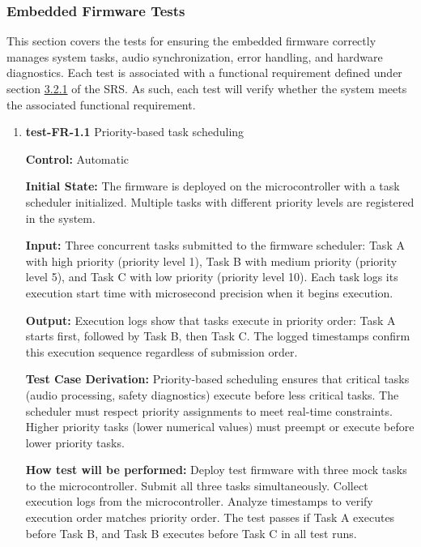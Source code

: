 \documentclass[12pt, titlepage]{article}
\begin{document}
\subsubsection{Embedded Firmware Tests}

This section covers the tests for ensuring the embedded firmware correctly 
manages system tasks, audio synchronization, error handling, and hardware 
diagnostics. Each test is associated with a functional requirement defined 
under section \hyperref[SRS-sec:FR1]{3.2.1} of the SRS. As such, each test 
will verify whether the system meets the associated functional requirement.

\begin{enumerate}

\item{\textbf{test-FR-1.1} Priority-based task scheduling \\}

\textbf{Control:} Automatic
					
\textbf{Initial State:} 
The firmware is deployed on the microcontroller with a task scheduler initialized. 
Multiple tasks with different priority levels are registered in the system.
					
\textbf{Input:}
Three concurrent tasks submitted to the firmware scheduler: Task A with high 
priority (priority level 1), Task B with medium priority (priority level 5), 
and Task C with low priority (priority level 10). Each task logs its execution 
start time with microsecond precision when it begins execution.
					
\textbf{Output:}
Execution logs show that tasks execute in priority order: Task A starts first, 
followed by Task B, then Task C. The logged timestamps confirm this execution 
sequence regardless of submission order.

\textbf{Test Case Derivation:} 
Priority-based scheduling ensures that critical tasks (audio processing, safety 
diagnostics) execute before less critical tasks. The scheduler must respect 
priority assignments to meet real-time constraints. Higher priority tasks 
(lower numerical values) must preempt or execute before lower priority tasks.
					
\textbf{How test will be performed:}
Deploy test firmware with three mock tasks to the microcontroller. Submit all 
three tasks simultaneously. Collect execution logs from the microcontroller. 
Analyze timestamps to verify execution order matches priority order. The test 
passes if Task A executes before Task B, and Task B executes before Task C 
in all test runs.


\end{enumerate}
\end{document}
